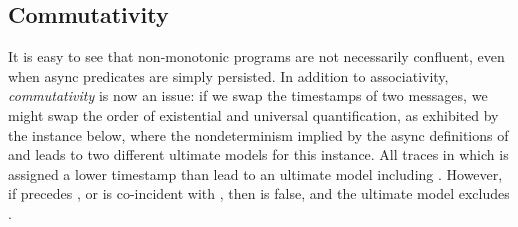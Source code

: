 



\subsection{Commutativity}



It is easy to see that non-monotonic programs are not necessarily confluent,
even when async predicates are simply persisted.  In addition to associativity,
{\em commutativity} is now an issue: if we swap the timestamps of two messages,
we might swap the order of existential and universal quantification, as
exhibited by the instance below, where the 
nondeterminism implied by the async definitions of  and 
leads to two different ultimate models for this instance.  All traces in which
 is assigned a lower timestamp than  lead to an ultimate
model including .  However, if  precedes
, or is co-incident with , then 
is false, and the ultimate model excludes .

